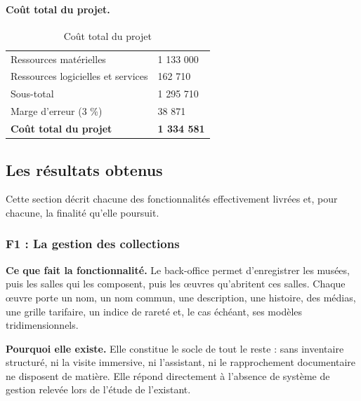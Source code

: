 \paragraph{Coût total du projet.}

\begin{table}[htbp]
\centering
\caption{Coût total du projet}
\label{tab:couttotal}
\small
\begin{tabularx}{\textwidth}{|X|R{3.4cm}|}
\hline
{}
 &  \\ \hline
Ressources matérielles & 1 133 000 \\ \hline
Ressources logicielles et services & 162 710 \\ \hline
Sous-total & 1 295 710 \\ \hline
Marge d'erreur (3 \%) & 38 871 \\ \hline
{}
\textbf{Coût total du projet} & \textbf{1 334 581} \\ \hline
\end{tabularx}
\end{table}

\subsection{Les résultats obtenus}
\label{sec:resultats}

Cette section décrit chacune des fonctionnalités effectivement livrées et, pour
chacune, la finalité qu'elle poursuit.

\subsubsection{F1 : La gestion des collections}

\textbf{Ce que fait la fonctionnalité.} Le back-office permet d'enregistrer les
musées, puis les salles qui les composent, puis les œuvres qu'abritent ces
salles. Chaque œuvre porte un nom, un nom commun, une description, une histoire,
des médias, une grille tarifaire, un indice de rareté et, le cas échéant, ses
modèles tridimensionnels.

\textbf{Pourquoi elle existe.} Elle constitue le socle de tout le reste : sans
inventaire structuré, ni la visite immersive, ni l'assistant, ni le
rapprochement documentaire ne disposent de matière. Elle répond directement à
l'absence de système de gestion relevée lors de l'étude de l'existant.

